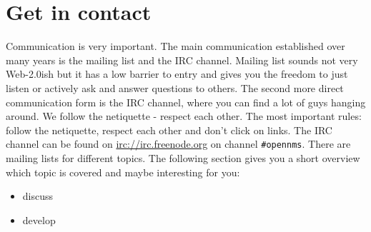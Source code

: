 \section{Get in contact}
Communication is very important. The main communication established over many years is the mailing list and the IRC channel. Mailing list sounds not very Web-2.0ish but it has a low barrier to entry and gives you the freedom to just listen or actively ask and answer questions to others. The second more direct communication form is the IRC channel, where you can find a lot of guys hanging around. We follow the netiquette - respect each other. The most important rules: follow the netiquette, respect each other and don't click on links. The IRC channel can be found on \url{irc://irc.freenode.org} on channel \texttt{\#opennms}.
There are mailing lists for different topics. The following section gives you a short overview which topic is covered and maybe interesting for you:

\begin{itemize}
  \item discuss
  \item develop
\end{itemize}
